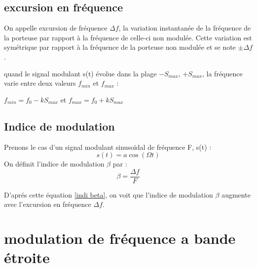 \documentclass[12pt,a4paper,hidelinks,oneside]{book}
\begin{document}
\subsection{excursion en fréquence}
On appelle excursion de fréquence $\Delta f$, la variation instantanée de la fréquence de la porteuse par rapport à la fréquence de celle-ci non modulée. Cette variation est symétrique par rapport à la fréquence de la porteuse non modulée et se note $\pm \Delta f$.

quand le signal modulant s(t) évolue dans la plage $-{S_{max}}$, $+{S_{max}}$, la fréquence varie entre deux valeurs ${f_{min}}$ et ${f_{max}}$ :

${f_{min}}=f_{0}-k{S_{max}}$  et  ${f_{max}}=f_{0}+k{S_{max}}$

\subsection{Indice de modulation}

Prenons le cas d'un signal modulant sinusoïdal de fréquence F, s(t) :
\begin{equation}
s(t)=a\cos(\Omega t)
\end{equation}
On définit l'indice de modulation $\beta$ par :
\begin{equation}
 \beta=\frac{\Delta f}{F} \label{indi beta}
\end{equation}

D'aprés cette équation \ref{indi beta}, on voit que l'indice de modulation $\beta$ augmente avec l'excursion en fréquence $\Delta f$.
\section{modulation de fréquence a bande étroite}
\end{document}
